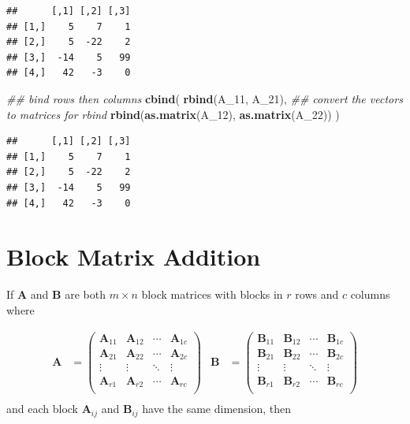 \documentclass[
]{book}
\newenvironment{Shaded}{\begin{snugshade}}{\end{snugshade}}
\newcommand{\CommentTok}[1]{\textcolor[rgb]{0.56,0.35,0.01}{\textit{#1}}}
\newcommand{\DecValTok}[1]{\textcolor[rgb]{0.00,0.00,0.81}{#1}}
\newcommand{\KeywordTok}[1]{\textcolor[rgb]{0.13,0.29,0.53}{\textbf{#1}}}
\newcommand{\NormalTok}[1]{#1}
\theoremstyle{definition}
\theoremstyle{definition}
\theoremstyle{definition}
\theoremstyle{remark}
\begin{document}
\begin{verbatim}
##      [,1] [,2] [,3]
## [1,]    5    7    1
## [2,]    5  -22    2
## [3,]  -14    5   99
## [4,]   42   -3    0
\end{verbatim}

\begin{Shaded}
\begin{Highlighting}[]
\CommentTok{## bind rows then columns}
\KeywordTok{cbind}\NormalTok{(}
    \KeywordTok{rbind}\NormalTok{(A_}\DecValTok{11}\NormalTok{, A_}\DecValTok{21}\NormalTok{),}
    \CommentTok{## convert the vectors to matrices for rbind}
    \KeywordTok{rbind}\NormalTok{(}\KeywordTok{as.matrix}\NormalTok{(A_}\DecValTok{12}\NormalTok{), }\KeywordTok{as.matrix}\NormalTok{(A_}\DecValTok{22}\NormalTok{))}
\NormalTok{)}
\end{Highlighting}
\end{Shaded}

\begin{verbatim}
##      [,1] [,2] [,3]
## [1,]    5    7    1
## [2,]    5  -22    2
## [3,]  -14    5   99
## [4,]   42   -3    0
\end{verbatim}

\hypertarget{block-matrix-addition}{%
\section{Block Matrix Addition}\label{block-matrix-addition}}

If \(\mathbf{A}\) and \(\mathbf{B}\) are both \(m \times n\) block matrices with blocks in \(r\) rows and \(c\) columns where

\[
\begin{aligned}
\mathbf{A} & =
\begin{pmatrix} \mathbf{A}_{11} & \mathbf{A}_{12} & \cdots & \mathbf{A}_{1c}\\
\mathbf{A}_{21} & \mathbf{A}_{22} &\cdots & \mathbf{A}_{2c} \\
\vdots & \vdots & \ddots & \vdots \\
\mathbf{A}_{r1} & \mathbf{A}_{r2} &\cdots & \mathbf{A}_{rc} \\
\end{pmatrix} &
\mathbf{B} & =
\begin{pmatrix} \mathbf{B}_{11} & \mathbf{B}_{12} & \cdots & \mathbf{B}_{1c}\\
\mathbf{B}_{21} & \mathbf{B}_{22} &\cdots & \mathbf{B}_{2c} \\
\vdots & \vdots & \ddots & \vdots \\
\mathbf{B}_{r1} & \mathbf{B}_{r2} &\cdots & \mathbf{B}_{rc} \\
\end{pmatrix} \\
\end{aligned}
\]
and each block \(\mathbf{A}_{ij}\) and \(\mathbf{B}_{ij}\) have the same dimension, then
\end{document}
